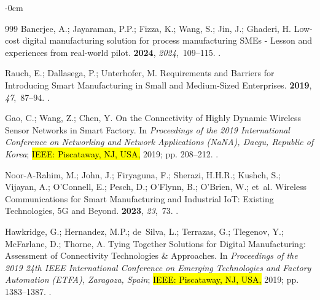 \documentclass[systems,article,accept,pdftex,moreauthors]{Definitions/mdpi}
\begin{document}
\begin{adjustwidth}{-\extralength}{0cm}
\begin{thebibliography}{999}
Banerjee, A.; Jayaraman, P.P.; Fizza, K.; Wang, S.; Jin, J.; Ghaderi, H.
\newblock Low-cost digital manufacturing solution for process manufacturing
  SMEs - Lesson and experiences from real-world pilot.
 {\bf 2024}, {\em 2024},~109--115.
.

Rauch, E.; Dallasega, P.; Unterhofer, M.
\newblock Requirements and Barriers for Introducing Smart Manufacturing in
  Small and Medium-Sized Enterprises.
 {\bf 2019}, {\em 47},~87--94.
.

Gao, C.; Wang, Z.; Chen, Y.
\newblock On the Connectivity of Highly Dynamic Wireless Sensor Networks in
  Smart Factory.
\newblock In \textit{Proceedings of the 2019 International Conference on Networking and
  Network Applications (NaNA), Daegu, Republic of Korea}; \hl{IEEE: Piscataway, NJ, USA,} %
  2019; pp. 208--212.
.

Noor-A-Rahim, M.; John, J.; Firyaguna, F.; Sherazi, H.H.R.; Kushch, S.;
  Vijayan, A.; O'Connell, E.; Pesch, D.; O'Flynn, B.; O'Brien, W.;  et~al.
\newblock Wireless Communications for Smart Manufacturing and Industrial IoT:
  Existing Technologies, 5G and Beyond.
 {\bf 2023}, {\em 23},~73.
.

Hawkridge, G.; Hernandez, M.P.; de~Silva, L.; Terrazas, G.; Tlegenov, Y.;
  McFarlane, D.; Thorne, A.
\newblock Tying Together Solutions for Digital Manufacturing: Assessment of
  Connectivity Technologies \& Approaches.
\newblock In \textit{Proceedings of the 2019 24th IEEE International Conference on
  Emerging Technologies and Factory Automation (ETFA), Zaragoza, Spain}; \hl{IEEE: Piscataway, NJ, USA,} %
  2019;  pp. 1383--1387.
.


\end{thebibliography}
\end{adjustwidth}
\end{document}
